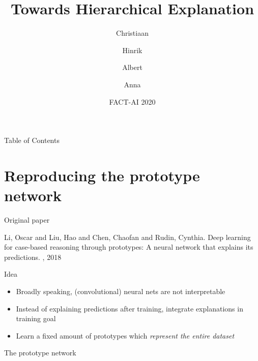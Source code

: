 \documentclass{beamer}[169]
\title{Towards Hierarchical Explanation}
\author{Christiaan \and Hinrik \and Albert \and Anna}
\date{FACT-AI 2020}
\begin{document}
\frame{\titlepage}

\begin{frame}{Table of Contents}
\tableofcontents
\end{frame}

\section{Reproducing the prototype network}
\begin{frame}{Original paper}
    \begin{thebibliography}{99}
        Li, Oscar and Liu, Hao and Chen, Chaofan and Rudin, Cynthia.
        \newblock Deep learning for case-based reasoning through prototypes: A neural network that explains its predictions.
        , 2018
    \end{thebibliography}
\end{frame}

\begin{frame}{Idea}
\begin{itemize}
    \item Broadly speaking, (convolutional) neural nets are not interpretable
    \item Instead of explaining predictions after training, integrate explanations in training goal
    \item Learn a fixed amount of \alert{prototypes} which \emph{represent the entire dataset}
\end{itemize}
% 
\end{frame}

\begin{frame}{The prototype network}
\begin{figure}
    
    \end{figure}
\end{frame}
\end{document}
